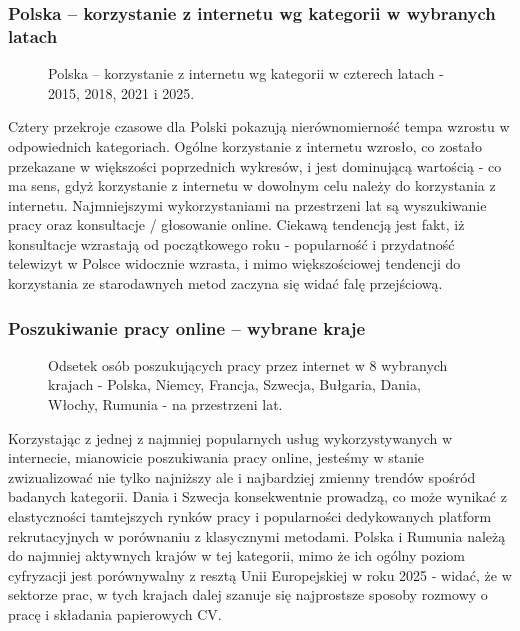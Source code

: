 \documentclass[12pt]{article}
\begin{document}
\newpage



\subsubsection{Polska – korzystanie z internetu wg kategorii w wybranych latach}

\begin{figure}[H]
    
    \caption{Polska – korzystanie z internetu wg kategorii w czterech latach - 2015, 2018, 2021 i 2025.}
\end{figure}

Cztery przekroje czasowe dla Polski pokazują nierównomierność tempa wzrostu w odpowiednich kategoriach. Ogólne korzystanie z internetu wzrosło, 
co zostało przekazane w większości poprzednich wykresów, i jest dominującą wartością - co ma sens, gdyż korzystanie z internetu w dowolnym 
celu należy do korzystania z internetu. Najmniejszymi wykorzystaniami na przestrzeni lat są wyszukiwanie pracy oraz konsultacje / głosowanie online.
Ciekawą tendencją jest fakt, iż konsultacje wzrastają od początkowego roku - popularność i przydatność telewizyt w Polsce widocznie wzrasta, i mimo 
większościowej tendencji do korzystania ze starodawnych metod zaczyna się widać falę przejściową.




\subsubsection{Poszukiwanie pracy online – wybrane kraje}

\begin{figure}[H]
    
    \caption{Odsetek osób poszukujących pracy przez internet w 8 wybranych krajach - Polska, Niemcy, Francja, Szwecja, Bułgaria, Dania, Włochy, Rumunia -
                na przestrzeni lat.}
\end{figure}

Korzystając z jednej z najmniej popularnych usług wykorzystywanych w internecie, mianowicie poszukiwania pracy online, jesteśmy w stanie zwizualizować
nie tylko najniższy ale i najbardziej zmienny trendów spośród badanych kategorii. Dania i Szwecja konsekwentnie prowadzą, co może wynikać z 
elastyczności tamtejszych rynków pracy i popularności dedykowanych platform rekrutacyjnych w porównaniu z klasycznymi metodami.
Polska i Rumunia należą do najmniej aktywnych krajów w tej kategorii, mimo że ich ogólny poziom cyfryzacji jest porównywalny z resztą Unii Europejskiej
w roku 2025 - widać, że w sektorze prac, w tych krajach dalej szanuje się najprostsze sposoby rozmowy o pracę i składania papierowych CV.
\end{document}
